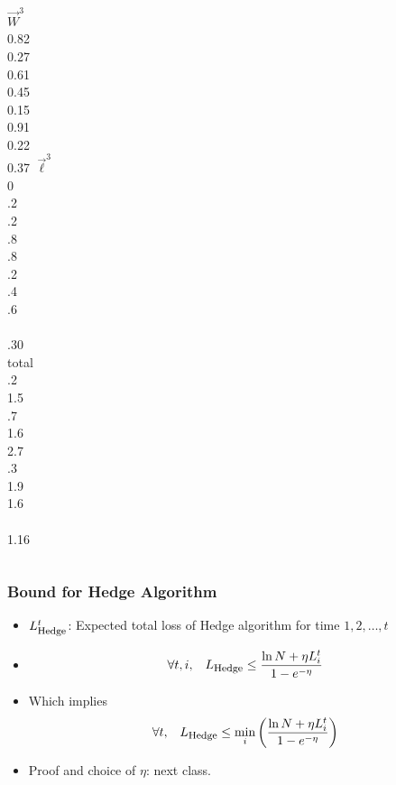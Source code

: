 \documentclass{beamer}
\newcommand{\W}{\vec{W}}
\newcommand{\loss}{\vec{\ell}}
\newcommand{\HedgeLoss}{L_{\mbox{\footnotesize Hedge}}}
\begin{document}
\begin{frame}
\begin{columns}
\column[t]{1cm}
  $\W^3$ \\0.82\\ 0.27\\0.61\\0.45\\0.15\\ 0.91\\0.22 \\ 0.37 
\column[t]{1cm}
$\loss^3$ \\ 0 \\ .2 \\ .2  \\ .8 \\ .8 \\  .2 \\  .4  \\ .6 \\ ~ \\
\color<11>{red} .30 \\

\column[t]{2cm}
 total\\ .2 \\ 1.5 \\ .7  \\ 1.6 \\ 2.7 \\ .3 \\ 1.9  \\ 1.6 \\ ~ \\
 1.16 \\

\end{columns} 
\end{frame} 

\begin{frame}
\frametitle{Bound for Hedge Algorithm}
\begin{itemize}
\item
$\HedgeLoss^t$: Expected total loss of Hedge algorithm for time $1,2,\ldots,t$ 
\item
\[
\forall t,i, \;\;\;
\HedgeLoss \leq \frac{\ln N + \eta L_i^t}{1-e^{-\eta}}
\]
\item Which implies
\[
\forall t, \;\;\;
\HedgeLoss \leq \min_i \left( \frac{\ln N + \eta L_i^t}{1-e^{-\eta}} \right)
\]
\item
Proof and choice of $\eta$: next class.
\end{itemize}
\end{frame}
\end{document}
